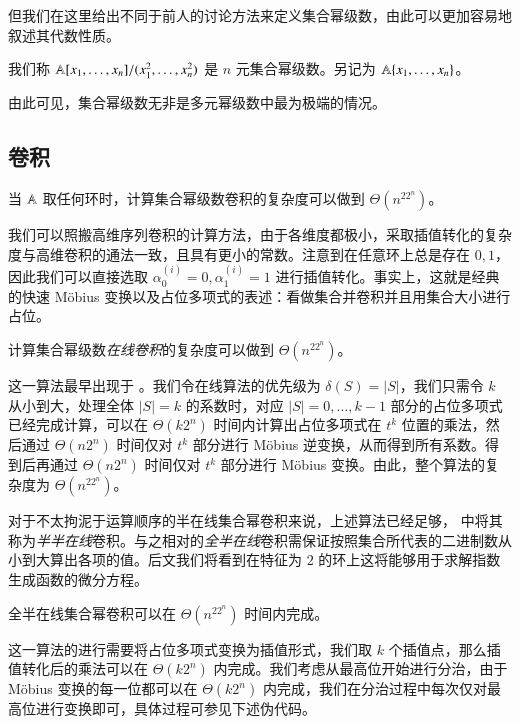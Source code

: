 但我们在这里给出不同于前人的讨论方法来定义集合幂级数，由此可以更加容易地叙述其代数性质。

\begin{definition}[集合幂级数的多元幂级数定义]
我们称 $\mathbb A[x_1,\dots,x_n]/(x_1^{2},\dots,x_n^{2})$ 是 $n$ 元集合幂级数。另记为 $\mathbb A\{x_1,\dots,x_n\}$。
\end{definition}

由此可见，集合幂级数无非是多元幂级数中最为极端的情况。

\subsection{卷积}

\begin{theorem}\label{cupconv}
当 $\mathbb A$ 取任何环时，计算集合幂级数卷积的复杂度可以做到 $\Theta(n^22^n)$。
\end{theorem}

我们可以照搬高维序列卷积的计算方法，由于各维度都极小，采取插值转化的复杂度与高维卷积的通法一致，且具有更小的常数。注意到在任意环上总是存在 $0,1$，因此我们可以直接选取 $\alpha^{(i)}_0= 0, \alpha^{(i)}_1= 1$ 进行插值转化。事实上，这就是经典的快速 M\"obius 变换以及占位多项式的表述：看做集合并卷积并且用集合大小进行占位。

\begin{theorem}
计算集合幂级数\emph{在线卷积}的复杂度可以做到 $\Theta(n^22^n)$。
\end{theorem}

这一算法最早出现于 \cite{walk}。我们令在线算法的优先级为 $\delta(S) = |S|$，我们只需令 $k$ 从小到大，处理全体 $|S|=k$ 的系数时，对应 $|S|=0,\dots,k-1$ 部分的占位多项式已经完成计算，可以在 $\Theta(k 2^n)$ 时间内计算出占位多项式在 $t^k$ 位置的乘法，然后通过 $\Theta(n2^n)$ 时间仅对 $t^k$ 部分进行 M\"obius 逆变换，从而得到所有系数。得到后再通过 $\Theta(n2^n)$ 时间仅对 $t^k$ 部分进行 M\"obius 变换。由此，整个算法的复杂度为 $\Theta(n^22^n)$。

对于不太拘泥于运算顺序的半在线集合幂卷积来说，上述算法已经足够，\cite{nimberpoly} 中将其称为\emph{半半在线}卷积。与之相对的\emph{全半在线}卷积需保证按照集合所代表的二进制数从小到大算出各项的值。后文我们将看到在特征为 $2$ 的环上这将能够用于求解指数生成函数的微分方程。

\begin{theorem}
全半在线集合幂卷积可以在 $\Theta(n^22^n)$ 时间内完成。
\end{theorem}

这一算法的进行需要将占位多项式变换为插值形式，我们取 $k$ 个插值点，那么插值转化后的乘法可以在 $\Theta(k2^n)$ 内完成。我们考虑从最高位开始进行分治，由于 M\"obius 变换的每一位都可以在 $\Theta(k2^n)$ 内完成，我们在分治过程中每次仅对最高位进行变换即可，具体过程可参见下述伪代码。


